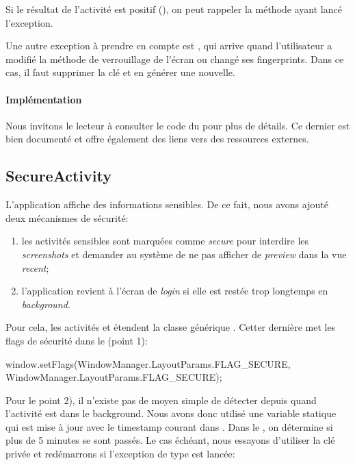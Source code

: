 Si le résultat de l'activité est positif (), on peut rappeler la méthode ayant lancé l'exception.

Une autre exception à prendre en compte est , qui arrive quand l'utilisateur a modifié la méthode de verrouillage de l'écran ou changé ses fingerprints. Dans ce cas, il faut supprimer la clé et en générer une nouvelle.

\paragraph*{Implémentation} Nous invitons le lecteur à consulter le code du  pour plus de détails. Ce dernier est bien documenté et offre également des liens vers des ressources externes.

\subsection{SecureActivity}

L'application affiche des informations sensibles. De ce fait, nous avons ajouté deux mécanismes de sécurité:
\begin{enumerate}
    \item les activités sensibles sont marquées comme \emph{secure} pour interdire les \emph{screenshots} et demander au système de ne pas afficher de \emph{preview} dans la vue \emph{recent};
    \item l'application revient à l'écran de \emph{login} si elle est restée trop longtemps en \emph{background}.
\end{enumerate}


Pour cela, les activités  et  étendent la classe générique . Cetter dernière met les flags de sécurité dans le  (point 1):

\begin{kotlincode}
window.setFlags(WindowManager.LayoutParams.FLAG_SECURE,
    WindowManager.LayoutParams.FLAG_SECURE);
\end{kotlincode}

Pour le point 2), il n'existe pas de moyen simple de détecter depuis quand l'activité est dans le background. Nous avons donc utilisé une variable statique qui est mise à jour avec le timestamp courant dans . Dans le , on détermine si plus de 5 minutes se sont passés. Le cas échéant, nous essayons d'utiliser la clé privée et redémarrons si l'exception de type  est lancée:

